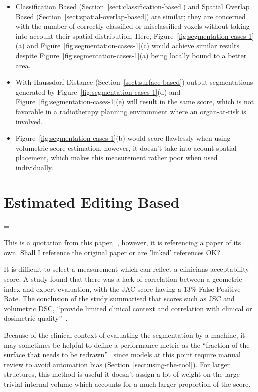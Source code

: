 \documentclass[11pt,twoside]{report}
\newenvironment{warning}
  {\par\begin{mdframed}[linewidth=1pt,linecolor=black]%
    \begin{list}{}{\leftmargin=1cm
                   \labelwidth=\leftmargin}\item[\Large\ding{43}]}
  {\end{list}\end{mdframed}\par}
\begin{document}
\begin{itemize}
  \item Classification Based (Section~\ref{sect:classification-based}) and Spatial Overlap Based (Section~\ref{sect:spatial-overlap-based}) are similar; they are concerned with the number of correctly classified or misclassified voxels without taking into account their spatial distribution. Here, Figure~\ref{fig:segmentation-cases-1}(a) and Figure~\ref{fig:segmentation-cases-1}(c) would achieve similar results despite Figure~\ref{fig:segmentation-cases-1}(a) being locally bound to a better area.
  \item With Haussdorf Distance (Section~\ref{sect:surface-based}) output segmentations generated by Figure~\ref{fig:segmentation-cases-1}(d) and Figure~\ref{fig:segmentation-cases-1}(e) will result in the same score, which is not favorable in a radiotherapy planning environment where an organ-at-risk is involved.
  \item Figure~\ref{fig:segmentation-cases-1}(b) would score flawlessly when using volumetric score estimation, however, it doesn't take into acount spatial placement, which makes this measurement rather poor when used individually.
\end{itemize}

\section{Estimated Editing Based}\label{sect:surface-dice}

\begin{warning}
  This is a quotation from this paper,~\cite{Sherer2021-le}, however, it is referencing a paper of its own. Shall I reference the original paper or are 'linked' references OK?
\end{warning}

It is difficult to select a measurement which can reflect a clinicians acceptability score. A study found that there was a lack of correlation between a geometric index and expert evaluation, with the JAC score having a 13\% False Positive Rate. The conclusion of the study summarised that scores such as JSC and volumetric DSC, ``provide limited clinical context and correlation with clinical or dosimetric quality''~\cite{Sherer2021-le}.

Because of the clinical context of evaluating the segmentation by a machine, it may sometimes be helpful to define a performance metric as the ``fraction of the surface that needs to be redrawn''~\cite{Nikolov2021-xe} since models at this point require manual review to avoid automation bias (Section~\ref{sect:using-the-tool}). For larger structures, this method is useful it doesn't assign a lot of weight on the large trivial internal volume which accounts for a much larger proportion of the score.
\end{document}
